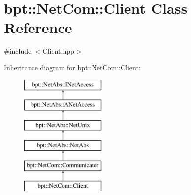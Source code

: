 \hypertarget{classbpt_1_1_net_com_1_1_client}{\section{bpt\-:\-:Net\-Com\-:\-:Client Class Reference}
\label{classbpt_1_1_net_com_1_1_client}
}


{\ttfamily \#include $<$Client.\-hpp$>$}

Inheritance diagram for bpt\-:\-:Net\-Com\-:\-:Client\-:\begin{figure}[H]
\begin{center}
\leavevmode
\includegraphics[height=6.000000cm]{classbpt_1_1_net_com_1_1_client}
\end{center}
\end{figure}
